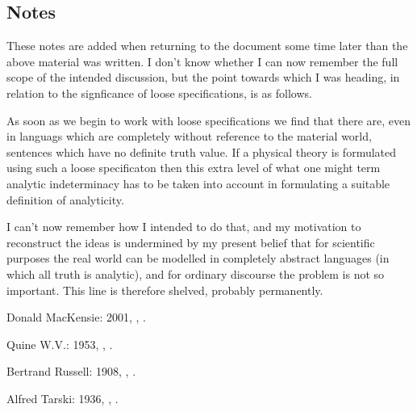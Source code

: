 \documentclass{rbjk}
\begin{document}
\begin{article}
\section{Notes}

These notes are added when returning to the document some time later than the above material was written.
I don't know whether I can now remember the full scope of the intended discussion, but the point towards which I was heading, in relation to the signficance of loose specifications, is as follows.

As soon as we begin to work with loose specifications we find that there are, even in languags which are completely without reference to the material world, sentences which have no definite truth value.
If a physical theory is formulated using such a loose specificaton then this extra level of what one might term analytic indeterminacy has to be taken into account in formulating a suitable definition of analyticity.

I can't now remember how I intended to do that, and my motivation to reconstruct the ideas is undermined by my present belief that for scientific purposes the real world can be modelled in completely abstract languages (in which all truth is analytic), and for ordinary discourse the problem is not so important.
This line is therefore shelved, probably permanently.

\begin{thebibliography}{}

Donald MacKensie: 2001,
,
.

Quine W.V.: 1953,
,
.

Bertrand Russell: 1908,
,
.

Alfred Tarski: 1936,
,
.

\end{thebibliography}
\end{article}
\end{document}
